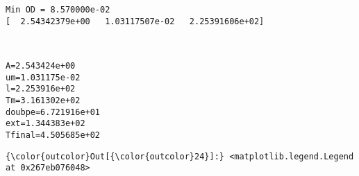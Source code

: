 \documentclass[11pt]{article}
\begin{document}
    \begin{Verbatim}[commandchars=\\\{\}]
Min OD = 8.570000e-02
[  2.54342379e+00   1.03117507e-02   2.25391606e+02]

    \end{Verbatim}

    \begin{center}
    \end{center}
    { \hspace*{\fill} \\}
    
    \begin{Verbatim}[commandchars=\\\{\}]
A=2.543424e+00
um=1.031175e-02
l=2.253916e+02
Tm=3.161302e+02
doubpe=6.721916e+01
ext=1.344383e+02
Tfinal=4.505685e+02

    \end{Verbatim}

            \begin{Verbatim}[commandchars=\\\{\}]
{\color{outcolor}Out[{\color{outcolor}24}]:} <matplotlib.legend.Legend at 0x267eb076048>
\end{Verbatim}
        
    \begin{center}
    \end{center}
    { \hspace*{\fill} \\}
    
    \begin{center}
    \end{center}
    { \hspace*{\fill} \\}
    
\end{document}

